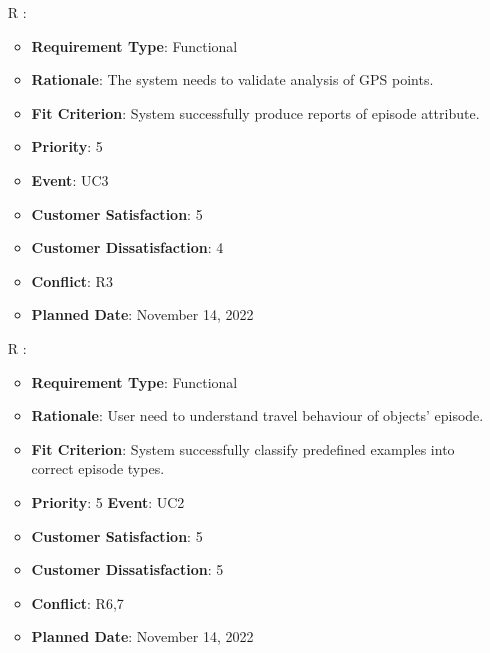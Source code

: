 \documentclass[12pt, titlepage]{article}
\newcounter{reqnum} %
\begin{document}
\begin{itemize}
\item[R\refstepcounter{reqnum}\thereqnum
\label{R_Inputs_1}:] 
\begin{itemize}
    \item \textbf{Requirement Type}: Functional
    \item \textbf{Rationale}: The system needs to validate  analysis of GPS points.
    \item \textbf{Fit Criterion}: System successfully produce reports of episode attribute.
    \item \textbf{Priority}: 5
    \item \textbf{Event}: UC3
    \item \textbf{Customer Satisfaction}: 5
    \item \textbf{Customer Dissatisfaction}: 4
    \item \textbf{Conflict}: R3
    \item \textbf{Planned Date}: November 14, 2022
\end{itemize}

\item[R\refstepcounter{reqnum}\thereqnum
\label{R_Inputs_1}:] 
\begin{itemize}
    \item \textbf{Requirement Type}: Functional
    \item \textbf{Rationale}: User need to understand travel behaviour of objects' episode.
    \item \textbf{Fit Criterion}: System successfully classify predefined examples into correct episode types. 
    \item \textbf{Priority}: 5
    \textbf{Event}: UC2
    \item \textbf{Customer Satisfaction}: 5
    \item \textbf{Customer Dissatisfaction}: 5
    \item \textbf{Conflict}: R6,7
    \item \textbf{Planned Date}: November 14, 2022
\end{itemize}


\end{itemize}
\end{document}
